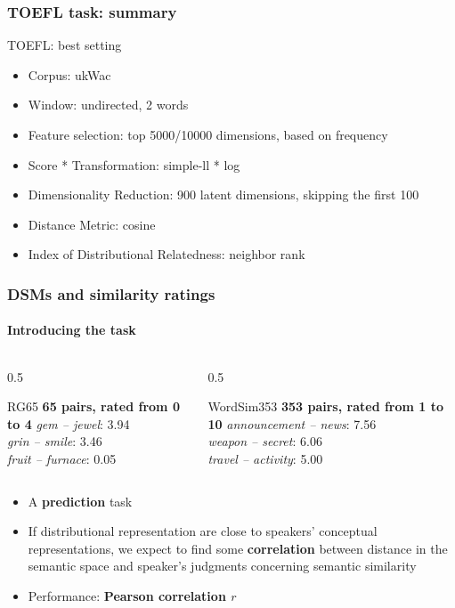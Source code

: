 \documentclass[t]{beamer} %
\begin{document}
\begin{frame}
  \frametitle{TOEFL task: summary}
  \begin{exampleblock}{TOEFL: best setting}
    \begin{itemize}\footnotesize
    \item Corpus: ukWac
    \item Window: undirected, 2 words 
    \item Feature selection: top 5000/10000 dimensions, based on frequency
    \item Score * Transformation: simple-ll * log
    \item Dimensionality Reduction: 900 latent dimensions, skipping the first 100
    \item Distance Metric: cosine
    \item Index of Distributional Relatedness: neighbor rank
    \end{itemize}
  \end{exampleblock}   
  
\end{frame}


\begin{frame}
  \frametitle{DSMs and similarity ratings}
  \framesubtitle{Introducing the task}

  \ungap[1]
  \begin{columns}
    \begin{column}{0.5\textwidth}
      \begin{exampleblock}{RG65}
        \textbf{65 pairs, rated from 0 to 4}
        \textit{gem -- jewel}: 3.94 \\
        \textit{grin -- smile}:  3.46 \\
        \textit{fruit -- furnace}: 0.05 \\
      \end{exampleblock}
    \end{column}
    \begin{column}{0.5\textwidth}
      
      
      \begin{exampleblock}  {WordSim353}
        \textbf{353 pairs, rated from 1 to 10}
        \textit{announcement -- news}: 7.56 \\
        \textit{weapon -- secret}:  6.06 \\
        \textit{travel -- activity}: 5.00 \\
      \end{exampleblock}
    \end{column}
  \end{columns}
  \begin{itemize}
  \item A \textbf{prediction} task
  \item If distributional representation are close to  speakers' conceptual representations, we expect to find some \textbf{correlation} between distance in the semantic space and speaker's judgments concerning semantic similarity
  \item Performance: \textbf{Pearson correlation $r$}
  \end{itemize}

\end{frame}
\end{document}
